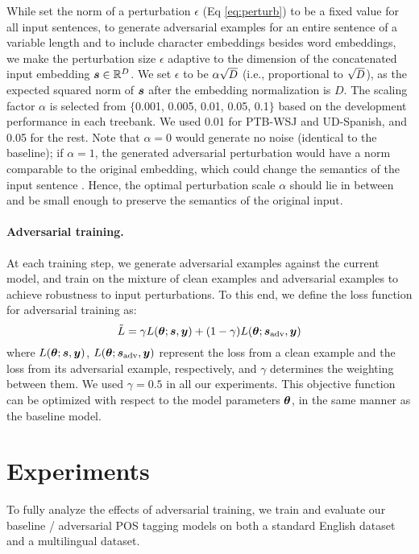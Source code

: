 \documentclass[11pt,a4paper]{article}
\newcommand{\veci}[1]{\mbox{\boldmath $#1$}}
\newcommand\scaleeq[3]{\mbox{\scalebox{#1}[#2]{$#3$}}}
\begin{document}
While  set the norm of a perturbation $\epsilon$ (Eq \ref{eq:perturb}) to be a fixed value for all input sentences,
to generate adversarial examples for an entire sentence of a variable length and to include character embeddings besides word embeddings, we make the perturbation size $\epsilon$ adaptive to the dimension of the concatenated input embedding $\veci{s} \in \mathbb{R}^D$. 
We set $\epsilon$ to be $\alpha \scaleeq{0.95}{0.95}{\sqrt{D}}$ (i.e., proportional to $\scaleeq{0.95}{0.95}{\sqrt{D}}$), as the expected squared norm of $\veci{s}$ after the embedding normalization is $D$.
The scaling factor $\alpha$ is selected from $\{$0.001, 0.005, 0.01, 0.05, 0.1$\}$ 
based on the development performance in each treebank. 
We used 0.01 for PTB-WSJ and UD-Spanish, and 0.05 for the rest.
Note that $\alpha \!=\! 0$ 
would generate no noise (identical to the baseline);
if $\alpha \!=\! 1$, the generated adversarial perturbation would have a norm comparable to the original embedding, which could change the semantics of the input sentence \cite{Wu2017adv}.
Hence, the optimal perturbation scale $\alpha$ should lie in between and be small enough to preserve the semantics of the original input.


\paragraph{Adversarial training.}

At each training step, we
generate adversarial examples against the current model, and train on the mixture of clean examples and adversarial examples to achieve robustness to input perturbations.
To this end, we define the loss function for adversarial training as:
$$ \tilde{L} = \gamma L(\veci{\theta}; \veci{s}, \veci{y}) + (1-\gamma) L(\veci{\theta}; \veci{s}_{\mathrm{adv}}, \veci{y})$$
where
$L(\veci{\theta}; \veci{s}, \veci{y})$, $L(\veci{\theta}; \veci{s}_{\mathrm{adv}}, \veci{y})$ represent the loss from a clean example and the loss from its adversarial example, respectively, and $\gamma $ determines the weighting between them.
We used $\gamma = 0.5$ in all our experiments.
This objective function can be optimized with respect to the model parameters $\veci{\theta}$, in the same manner as the baseline model.




\section{Experiments}
To fully analyze the effects of adversarial training,
we train and evaluate our baseline \!/\! adversarial POS tagging models on both a standard English dataset and a multilingual dataset.
\end{document}
